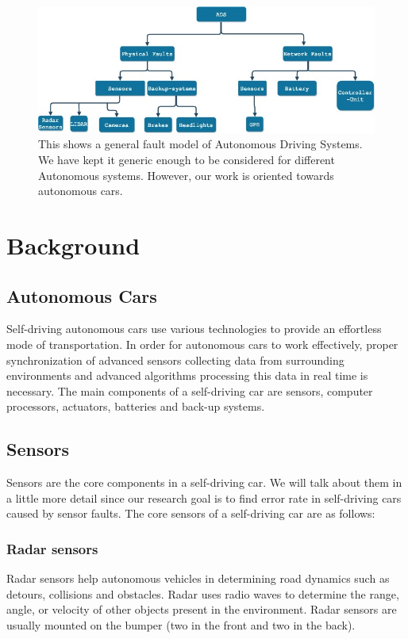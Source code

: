 
\begin{figure}
	\centering
	\includegraphics[width=0.8\linewidth]{Fault-modelgeneral}
	\caption[Fault-model for ADS]{This shows a general fault model of Autonomous Driving Systems. We have kept it generic enough to be considered for different Autonomous systems. However, our work is oriented towards autonomous cars.}
	\label{fig:fault-modelgeneral}
\end{figure}
\section{Background} \label{background}
\subsection{ Autonomous Cars}
Self-driving autonomous cars use various technologies to provide an effortless mode of transportation. In order for autonomous cars to work effectively, proper synchronization of advanced sensors collecting data from surrounding environments and advanced algorithms processing this data in real time is necessary. The main components of a self-driving car are sensors, computer processors, actuators, batteries and back-up systems.

\subsection{Sensors}
Sensors are the core components in a self-driving car. We will talk about them in a little more detail since our research goal is to find error rate in self-driving cars caused by sensor faults. The core sensors of a self-driving car are as follows:

\smallskip
\subsubsection{Radar sensors}
Radar sensors help autonomous vehicles in determining road dynamics such as detours, collisions and obstacles. Radar uses radio waves to determine the range, angle, or velocity of other objects present in the environment. Radar sensors are usually mounted on the bumper (two in the front and two in the back).


